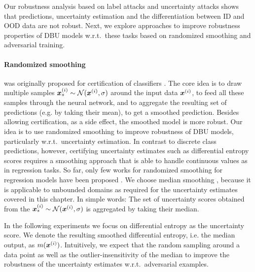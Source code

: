 Our robustness analysis based on label attacks and uncertainty attacks shows that predictions, uncertainty estimation and the differentiation between ID and OOD data are not robust. Next, we explore approaches to improve robustness properties of DBU models w.r.t.\ these tasks based on randomized smoothing and adversarial training. 

\paragraph{Randomized smoothing} was originally proposed for certification of classifiers \cite{cohen2019}.
The core idea is to draw multiple samples ${\bm{x}}^{(i)}_s \sim \operatorname{\mathcal{N}}({\bm{x}}^{(i)}, \sigma)$ around the input data ${\bm{x}}^{(i)}$, to feed all these samples through the neural network, and to aggregate the resulting set of predictions (e.g. by taking their mean), to get a smoothed prediction. Besides allowing certification, as a side effect, the smoothed model is more robust. Our idea is to use randomized smoothing to improve robustness of DBU models, particularly w.r.t.\ uncertainty estimation. In contrast to discrete class predictions, however, certifying uncertainty estimates such as differential entropy scores requires a smoothing approach that is able to handle continuous values as in regression tasks. So far, only few works for randomized smoothing for regression models have been proposed \citep{confidence_certificate_rs,median_smoothing}. We choose median smoothing \citep{median_smoothing}, because it is applicable to unbounded domains as required for the uncertainty estimates covered in this chapter. In simple words: The set of uncertainty scores obtained from the ${\bm{x}}^{(i)}_s \sim \operatorname{\mathcal{N}}({\bm{x}}^{(i)}, \sigma)$ is aggregated by taking their median. 

In the following experiments we focus on differential entropy as the uncertainty score. We denote the resulting smoothed differential entropy, i.e. the median output, as $m({\bm{x}}^{(i)})$.
Intuitively, we expect that the random sampling around a data point as well as the outlier-insensitivity of the median to improve the robustness of the uncertainty estimates w.r.t.\ adversarial examples.

